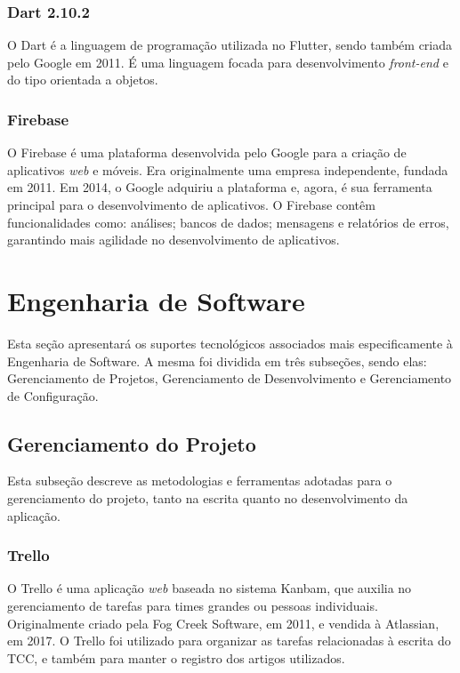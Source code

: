 \subsubsection{Dart 2.10.2}

O Dart \cite{flutter2017} é a linguagem de programação utilizada no Flutter, sendo também 
criada pelo Google em 2011. É uma linguagem focada para 
desenvolvimento \emph{front-end} e do tipo orientada a objetos.

\subsubsection{Firebase}

O Firebase \cite{firebase2011} é uma plataforma desenvolvida pelo Google para a criação de aplicativos 
\emph{web} e móveis. Era originalmente uma empresa independente, fundada em 2011. 
Em 2014, o Google adquiriu a plataforma e, agora, é sua ferramenta principal 
para o desenvolvimento de aplicativos. O Firebase contêm funcionalidades como: 
análises; bancos de dados; mensagens e relatórios de erros, garantindo mais agilidade no desenvolvimento de aplicativos.

\section{Engenharia de Software}

Esta seção apresentará os suportes tecnológicos associados mais especificamente 
à Engenharia de Software. A mesma foi dividida em três subseções, sendo elas: 
Gerenciamento de Projetos, Gerenciamento de Desenvolvimento e Gerenciamento de 
Configuração.

\subsection{Gerenciamento do Projeto}

Esta subseção descreve as metodologias e ferramentas adotadas para o gerenciamento 
do projeto, tanto na escrita quanto no desenvolvimento da aplicação.

\subsubsection{Trello}

O Trello \cite{trello2011} é uma aplicação \emph{web} baseada no sistema Kanbam, que auxilia no 
gerenciamento de tarefas para times grandes ou pessoas individuais. 
Originalmente criado pela Fog Creek Software, em 2011, e vendida à Atlassian, em 
2017. O Trello foi utilizado para organizar as tarefas 
relacionadas à escrita do TCC, e também para manter o registro dos artigos utilizados.

